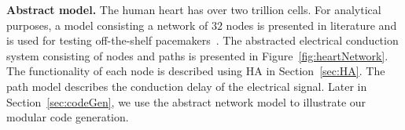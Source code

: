 \noindent \textbf{Abstract model.}
The human heart has over two trillion cells. For analytical purposes, a
model consisting a network of $32$ nodes is presented in literature
and is used for testing off-the-shelf pacemakers~\cite{chen14,zhihao12}.
The abstracted electrical conduction system consisting  of 
nodes and paths is presented in Figure~\ref{fig:heartNetwork}.
The functionality of each node is described using \acf{HA} in Section~\ref{sec:HA}. The path model describes the 
conduction delay of the electrical signal.
Later in Section~\ref{sec:codeGen}, we use the abstract network model 
to illustrate our modular code generation.

 
